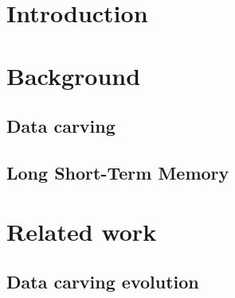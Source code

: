 
\listoftodos

\chapter{\label{chap:introduction}Introduction}






\chapter{\label{chap:background}Background}

\section{\label{sec:datacarving}Data carving}



\section{\label{sec:lstm}Long Short-Term Memory}


\chapter{Related work}

    \section{Data carving evolution}
    
